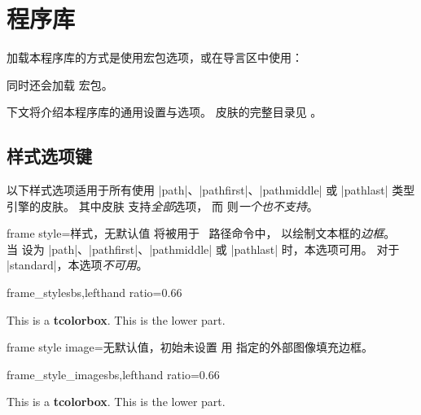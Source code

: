 \clearpage
\section{程序库 }\label{sec:skins}%
%
加载本程序库的方式是使用宏包选项，或在导言区中使用：
\begin{dispListing}
\end{dispListing}
同时还会加载  宏包。

下文将介绍本程序库的通用设置与选项。
皮肤的完整目录见 。

\subsection{样式选项键}\label{subsec:addstyleoptions}
以下样式选项适用于所有使用 |path|、|pathfirst|、|pathmiddle|
或 |pathlast| 类型引擎的皮肤。
其中皮肤  支持\emph{全部}选项，
而  则\emph{一个也不支持}。

\begin{docTcbKey}{frame style}{=}{样式，无默认值}
  将被用于 \tikzname\ 路径命令中，
  以绘制文本框的\emph{边框}。\\
  当  设为
  |path|、|pathfirst|、|pathmiddle| 或 |pathlast| 时，本选项可用。
  对于 |standard|，本选项\emph{不可用}。
\begin{exdispExample*}{frame_style}{sbs,lefthand ratio=0.66}

\begin{tcolorbox}[enhanced,title=My title,
  frame style={left color=red!75!black,
               right color=blue!75!black}]
This is a \textbf{tcolorbox}.
\tcblower
This is the lower part.
\end{tcolorbox}
\end{exdispExample*}
\end{docTcbKey}


\begin{docTcbKey}{frame style image}{=}{无默认值，初始未设置}
  用  指定的外部图像填充边框。
\begin{exdispExample*}{frame_style_image}{sbs,lefthand ratio=0.66}

\begin{tcolorbox}[enhanced,title=My title,
  frame style image=blueshade.png]
This is a \textbf{tcolorbox}.
\tcblower
This is the lower part.
\end{tcolorbox}
\end{exdispExample*}
\end{docTcbKey}

